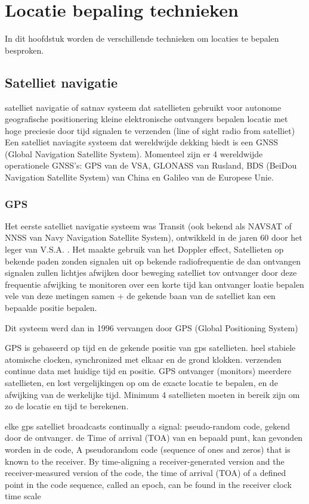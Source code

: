 \chapter{Locatie bepaling technieken}
\label{ch:locatiebepalingtechnieken}
In dit hoofdstuk worden de verschillende technieken om locaties te bepalen besproken.

\section{Satelliet navigatie}
\label{sec: sattelietnavigatie}
satelliet navigatie of satnav
systeem dat satellieten gebruikt voor autonome geografische positionering
kleine elektronische ontvangers bepalen locatie met hoge preciesie door tijd signalen te verzenden (line of sight radio from satelliet)
Een satelliet naviagite systeem dat wereldwijde dekking biedt is een GNSS (Global Navigation Satellite System).
Momenteel zijn er 4 wereldwijde operationele GNSS's: GPS van de VSA, GLONASS van Rusland, BDS (BeiDou Navigation Satellite System) van China en Galileo van de Europese Unie. 


\subsection{GPS}
Het eerste satelliet navigatie systeem was Transit (ook bekend als NAVSAT of NNSS van Navy Navigation Satellite System), ontwikkeld in de jaren 60 door het leger van V.S.A. . Het maakte gebruik van het Doppler effect,
Satellieten op bekende paden
zonden signalen uit op bekende radiofrequentie
de dan ontvangen signalen zullen lichtjes afwijken
door beweging satelliet tov ontvanger
door deze frequentie afwijking te monitoren over een korte tijd
kan ontvanger loatie bepalen
vele van deze metingen samen
+ de gekende baan van de satelliet
kan een bepaalde positie bepalen.

Dit systeem werd dan in 1996 vervangen door GPS (Global Positioning System) 

GPS is gebaseerd op tijd en de gekende positie van gps satellieten. heel stabiele atomische clocken, synchronized met elkaar en de grond klokken. 
verzenden continue data met huidige tijd en positie. GPS ontvanger (monitors) meerdere satellieten, en lost vergelijkingen op om de exacte locatie te bepalen, en de afwijking van de werkelijke tijd.
Minimum 4 satellieten moeten in bereik zijn om zo de locatie en tijd te berekenen.

elke gps satelliet broadcasts continually a signal:
pseudo-random code, gekend door de ontvanger. de Time of arrival (TOA) van en bepaald punt, kan gevonden worden in de code, 
A pseudorandom code (sequence of ones and zeros) that is known to the receiver. By time-aligning a receiver-generated version and the receiver-measured version of the code, the time of arrival (TOA) of a defined point in the code sequence, called an epoch, can be found in the receiver clock time scale

